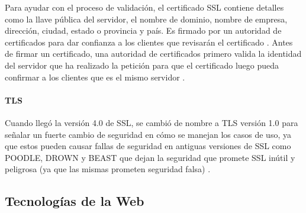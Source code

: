 Para ayudar con el proceso de validación, el certificado SSL contiene detalles como la llave pública del servidor, el nombre de dominio, nombre de empresa, dirección, ciudad, estado o provincia y país. Es firmado por un autoridad de certificados para dar confianza a los clientes que revisarán el certificado \citep{info.SSL.com-SSL}. Antes de firmar un certificado, una autoridad de certificados primero valida la identidad del servidor que ha realizado la petición para que el certificado luego pueda confirmar a los clientes que es el mismo servidor \citep{GlobalSign-SSL}.

\paragraph{TLS}
Cuando llegó la versión 4.0 de SSL, se cambió de nombre a TLS versión 1.0 \citep{DigiCert-SSL} para señalar un fuerte cambio de seguridad en cómo se manejan los casos de uso, ya que estos pueden causar fallas de seguridad en antiguas versiones de SSL como POODLE, DROWN y BEAST que dejan la seguridad que promete SSL inútil y peligrosa (ya que las mismas prometen seguridad falsa) \citep{LuxSci-SSL-vs-TLS} \citep{GlobalSign-SSL-vs-TLS}.

\subsection{Tecnologías de la Web}

